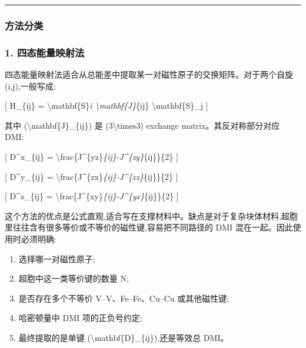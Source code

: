 \documentclass[lang=cn,scheme=chinese,color=blue,device=normal,toc=onecol,math=cm]{elegantbook}
\begin{document}
\medskip\hrule\medskip


\subsubsection{方法分类}


\subsubsection{1. 四态能量映射法}


四态能量映射法适合从总能差中提取某一对磁性原子的交换矩阵。对于两个自旋 (i,j),一般写成:\par


[ H\_\allowbreak{}\{ij\} = \textbackslash{}\allowbreak{}mathbf\{S\}\emph{i \textbackslash{}\allowbreak{}mathbf\{J\}}\{ij\} \textbackslash{}\allowbreak{}mathbf\{S\}\_\allowbreak{}j ]\par


其中 (\textbackslash{}\allowbreak{}mathbf\{J\}\_\allowbreak{}\{ij\}) 是 (3\textbackslash{}\allowbreak{}times3) exchange matrix。其反对称部分对应 DMI:\par


[ D\textasciicircum{}x\_\allowbreak{}\{ij\} = \textbackslash{}\allowbreak{}frac\{J\textasciicircum{}\{yz\}\emph{\{ij\}-J\textasciicircum{}\{zy\}}\{ij\}\}\{2\} ]\par


[ D\textasciicircum{}y\_\allowbreak{}\{ij\} = \textbackslash{}\allowbreak{}frac\{J\textasciicircum{}\{zx\}\emph{\{ij\}-J\textasciicircum{}\{xz\}}\{ij\}\}\{2\} ]\par


[ D\textasciicircum{}z\_\allowbreak{}\{ij\} = \textbackslash{}\allowbreak{}frac\{J\textasciicircum{}\{xy\}\emph{\{ij\}-J\textasciicircum{}\{yx\}}\{ij\}\}\{2\} ]\par


这个方法的优点是公式直观,适合写在支撑材料中。缺点是对于复杂块体材料,超胞里往往含有很多等价或不等价的磁性键,容易把不同路径的 DMI 混在一起。因此使用时必须明确:\par


\begin{enumerate}
\item 选择哪一对磁性原子;
\item 超胞中这一类等价键的数量 N;
\item 是否存在多个不等价 V–V、Fe–Fe、Cu–Cu 或其他磁性键;
\item 哈密顿量中 DMI 项的正负号约定;
\item 最终提取的是单键 (\textbackslash{}\allowbreak{}mathbf\{D\}\_\allowbreak{}\{ij\}),还是等效总 DMI。
\end{enumerate}
\end{document}
